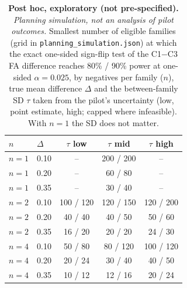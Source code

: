 \begin{table}[t]\centering\footnotesize
\caption{\textbf{Post hoc, exploratory (not pre-specified).} \emph{Planning simulation, not an analysis of pilot outcomes.} Smallest number of eligible families (grid in \texttt{planning\_simulation.json}) at which the exact one-sided sign-flip test of the C1$-$C3 FA difference reaches 80\% / 90\% power at one-sided $\alpha=0.025$, by negatives per family ($n$), true mean difference $\Delta$ and the between-family SD $\tau$ taken from the pilot's uncertainty (low, point estimate, high; capped where infeasible). With $n=1$ the SD does not matter.}\label{tab:plan-families}
\begin{tabular}{llccc}\toprule $n$ & $\Delta$ & $\tau$ low & $\tau$ mid & $\tau$ high \\\midrule
$n=1$ & 0.10 & -- & 200 / 200 & -- \\
$n=1$ & 0.20 & -- & 60 / 80 & -- \\
$n=1$ & 0.35 & -- & 30 / 40 & -- \\
$n=2$ & 0.10 & 100 / 120 & 120 / 150 & 120 / 200 \\
$n=2$ & 0.20 & 40 / 40 & 40 / 50 & 50 / 60 \\
$n=2$ & 0.35 & 16 / 20 & 20 / 20 & 24 / 30 \\
$n=4$ & 0.10 & 50 / 80 & 80 / 120 & 100 / 120 \\
$n=4$ & 0.20 & 20 / 24 & 30 / 40 & 40 / 50 \\
$n=4$ & 0.35 & 10 / 12 & 12 / 16 & 20 / 24 \\
\bottomrule\end{tabular}\end{table}
